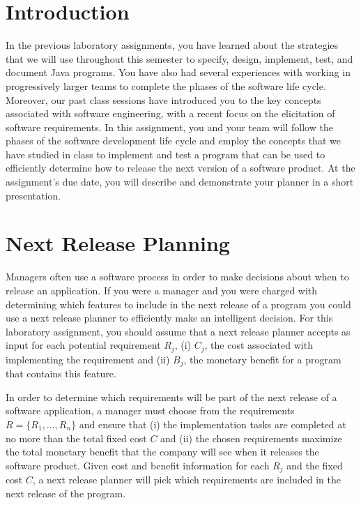 

\usepackage[compact]{titlesec}



\section*{Introduction}

In the previous laboratory assignments, you have learned about the strategies that we will use throughout this semester
to specify, design, implement, test, and document Java programs.  You have also had several experiences with working in
progressively larger teams to complete the phases of the software life cycle.  Moreover, our past class sessions have
introduced you to the key concepts associated with software engineering, with a recent focus on the elicitation of
software requirements.  In this assignment, you and your team will follow the phases of the software development life
cycle and employ the concepts that we have studied in class to implement and test a program that can be used to
efficiently determine how to release the next version of a software product. At the assignment's due date, you will
describe and demonstrate your planner in a short presentation.

\section*{Next Release Planning}

Managers often use a software process in order to make decisions about when to release an application.  If you were a
manager and you were charged with determining which features to include in the next release of a program you could
use a next release planner to efficiently make an intelligent decision.  For this laboratory assignment, you should
assume that a next release planner accepts as input for each potential requirement $R_j$, (i) $C_j$, the cost associated with
implementing the requirement and (ii) $B_j$, the monetary benefit for a program that contains this feature.

In order to determine which requirements will be part of the next release of a software application, a manager must
choose from the requirements $R = \{ R_1, \ldots, R_n \}$ and ensure that (i) the implementation tasks are completed at
no more than the total fixed cost $C$ and (ii) the chosen requirements maximize the total monetary benefit that the
company will see when it releases the software product.  Given cost and benefit information for each $R_j$ and the fixed
cost $C$, a next release planner will pick which requirements are included in the next release of the program.

